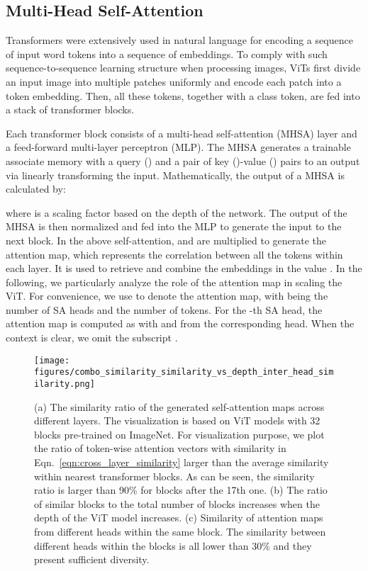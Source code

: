 \documentclass[10pt,twocolumn,letterpaper]{article}
\begin{document}
\subsection{Multi-Head Self-Attention}
Transformers \cite{vaswani2017attention} were extensively used in natural language  
for encoding a sequence of input word tokens into a sequence of embeddings. 
To comply with such sequence-to-sequence  learning structure when processing images, 
ViTs first divide an input image into multiple  patches uniformly and
encode each patch into a token embedding. 
Then, all these tokens, together with a class token,  are fed into a stack of transformer blocks. 

Each transformer block consists of a multi-head self-attention (MHSA) layer 
and a feed-forward  multi-layer perceptron (MLP). The MHSA   generates a trainable associate memory with a query () and a pair of key ()-value () pairs to an output
via linearly transforming the input.  
Mathematically, the output of a MHSA is calculated by:

where  is a scaling factor based on the depth of the network. The output of the MHSA is then normalized and   fed into the MLP to generate the input to the next block. 
In the above self-attention,  and  are multiplied to generate the attention map, which represents the correlation
between all the tokens within each layer. It is used to retrieve and combine the embeddings in the value  . In the following, we particularly analyze the role of the attention map in   scaling the ViT. For convenience,  we use  to denote the attention map, with  being the number of SA heads and  the number of tokens. For the -th SA head, the attention map is computed as   with  and  from the corresponding head.
When the context is clear, we omit the subscript .


\begin{figure*}[t]
\begin{center}
\texttt{[image: figures/combo\_similarity\_similarity\_vs\_depth\_inter\_head\_similarity.png]}
\vspace{-20pt}
\end{center}
  \caption{(a) The similarity ratio of the generated self-attention maps across different layers. The visualization is based on ViT models with 32 blocks pre-trained on ImageNet. For visualization purpose, we plot the ratio of token-wise attention vectors with similarity in Eqn.~\eqref{eqn:cross_layer_similarity} larger than   the average similarity within nearest   transformer blocks. As can be seen, the similarity ratio is   larger than 90\% for blocks after the 17th one. (b) The ratio  of similar blocks to the total number of blocks increases when the depth of the ViT model increases.   (c) Similarity of attention maps from different heads within the same block. The similarity between different heads within the blocks is all lower than 30\% and they present sufficient diversity.}
  \vspace{-10pt}
\label{fig:atten_similarity}
\end{figure*}
\end{document}
